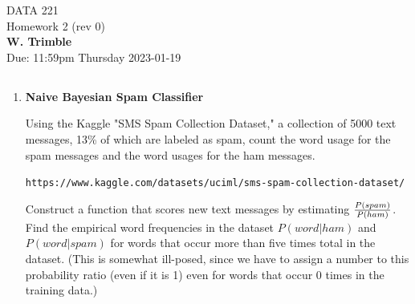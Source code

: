 \documentclass[12pt]{book}
\theoremstyle{definition}
\begin{document}
\begin{center}
{\Large DATA 221 \\  Homework 2  (rev 0)}\\
\textbf{W. Trimble}\\ %
Due: 11:59pm  Thursday 2023-01-19 
\end{center}

\vspace{0.2 cm}

\subsection*{   }

\begin{enumerate}

%


\item


\textbf{Naive Bayesian Spam Classifier}

Using the Kaggle "SMS Spam Collection Dataset," a collection of 5000 text messages, 13\% of which are labeled as spam, count the word usage for the spam messages and the word usages for the ham messages.

\texttt{https://www.kaggle.com/datasets/uciml/sms-spam-collection-dataset/}

Construct a function that scores new text messages by estimating $ {P (spam ) \over P(ham) } $.  Find the empirical word frequencies in the dataset $P (word | ham)$ and $P( word | spam ) $ 
for words that occur more than five times total in the dataset.
(This is somewhat ill-posed, since we have to assign a number to this probability ratio (even if it is 1) even for words that occur 0 times in the training data.)


\end{enumerate}
\end{document}
